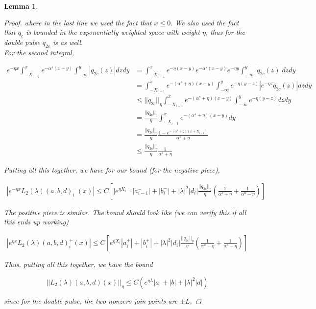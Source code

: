 \documentclass[12pt]{article}
\newtheorem{lemma}{Lemma}
\begin{document}
\begin{lemma}
\begin{proof}
where in the last line we used the fact that $x \leq 0$. We also used the fact that $q_c$ is bounded in the exponentially weighted space with weight $\eta$, thus for the double pulse $q_{2c}$ is as well.\\

For the second integral,

\begin{align*}
e^{-\eta x} \int_{-X_{i-1}}^x e^{-\alpha^s (x - y)}\int_{-\infty}^y |q_{2c}(z)| dz dy &=
\int_{-X_{i-1}}^x e^{-\eta (x-y)} e^{-\alpha^s (x - y)}e^{-\eta y}\int_{-\infty}^y |q_{2c}(z)| dz dy \\
&= \int_{-X_{i-1}}^x e^{-(\alpha^s + \eta) (x - y)}\int_{-\infty}^y e^{-\eta(y-z)} |e^{-\eta z} q_{2c}(z)| dz dy \\
&\leq ||q_{2c}||_\eta \int_{-X_{i-1}}^x e^{-(\alpha^s + \eta) (x - y)} \int_{-\infty}^y e^{-\eta(y-z)}  dz dy \\
&= \frac{ ||q_{2c}||_\eta }{\eta} \int_{-X_{i-1}}^x e^{-(\alpha^s + \eta) (x - y)} dy \\
&= \frac{ ||q_{2c}||_\eta }{\eta} \frac{1- e^{-(\alpha^s + \eta)(x + X_{i-1})}}{\alpha^s + \eta} \\
&\leq \frac{ ||q_{2c}||_\eta }{\eta} \frac{1}{\alpha^s + \eta}
\end{align*}

Putting all this together, we have for our bound (for the negative piece),

\begin{align*}
| e^{-\eta x} L_2(\lambda)(a, b, d)_i^-(x)| \leq C \left[] e^{\eta X_{i-1}}|a^-_{i-1}| + |b_i^-| + |\lambda|^2 |d_i|  \frac{ ||q_{2c}||_\eta }{\eta} \left( \frac{1}{\alpha^s + \eta} + \frac{1}{\alpha^u - \eta} \right)\right]
\end{align*}

The positive piece is similar. The bound should look like (we can verify this if all this ends up working)

\begin{align*}
| e^{\eta x} L_2(\lambda)(a, b, d)_i^+(x)| \leq C \left[ e^{\eta X_{i}}|a_i^+| + |b_i^+| + |\lambda|^2 |d_i|  \frac{ ||q_{2c}||_\eta }{\eta} \left( \frac{1}{\alpha^u + \eta} + \frac{1}{\alpha^s - \eta} \right)\right]
\end{align*}

Thus, putting all this together, we have the bound

\[
||L_2(\lambda)(a, b, d)(x)||_\eta \leq C(e^{\eta L}|a| + |b| + |\lambda|^2 |d|)
\]

since for the double pulse, the two nonzero join points are $\pm L$.

\end{proof}

\end{lemma}
\end{document}
